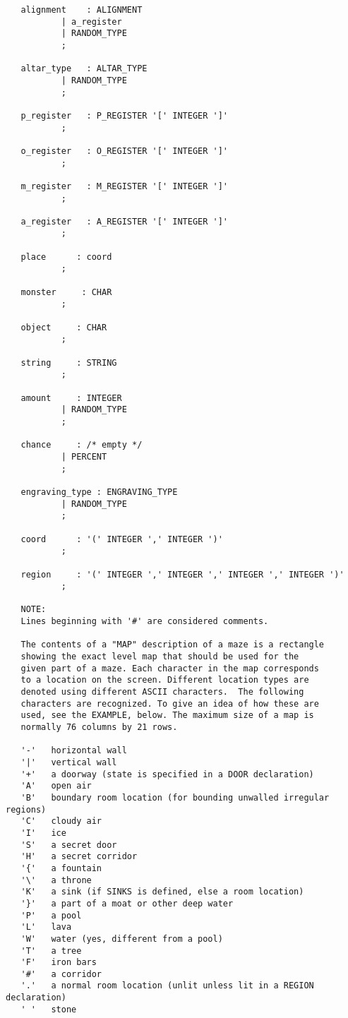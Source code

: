 \documentclass[11pt]{article}
\begin{document}
\begin{verbatim}
   alignment    : ALIGNMENT
           | a_register
           | RANDOM_TYPE
           ;

   altar_type   : ALTAR_TYPE
           | RANDOM_TYPE
           ;

   p_register   : P_REGISTER '[' INTEGER ']'
           ;

   o_register   : O_REGISTER '[' INTEGER ']'
           ;

   m_register   : M_REGISTER '[' INTEGER ']'
           ;

   a_register   : A_REGISTER '[' INTEGER ']'
           ;

   place      : coord
           ;

   monster     : CHAR
           ;

   object     : CHAR
           ;

   string     : STRING
           ;

   amount     : INTEGER
           | RANDOM_TYPE
           ;

   chance     : /* empty */
           | PERCENT
           ;

   engraving_type : ENGRAVING_TYPE
           | RANDOM_TYPE
           ;

   coord      : '(' INTEGER ',' INTEGER ')'
           ;

   region     : '(' INTEGER ',' INTEGER ',' INTEGER ',' INTEGER ')'
           ;

   NOTE:
   Lines beginning with '#' are considered comments.

   The contents of a "MAP" description of a maze is a rectangle
   showing the exact level map that should be used for the
   given part of a maze. Each character in the map corresponds
   to a location on the screen. Different location types are
   denoted using different ASCII characters.  The following
   characters are recognized. To give an idea of how these are
   used, see the EXAMPLE, below. The maximum size of a map is
   normally 76 columns by 21 rows.

   '-'   horizontal wall
   '|'   vertical wall
   '+'   a doorway (state is specified in a DOOR declaration)
   'A'   open air
   'B'   boundary room location (for bounding unwalled irregular regions)
   'C'   cloudy air
   'I'   ice
   'S'   a secret door
   'H'   a secret corridor
   '{'   a fountain
   '\'   a throne
   'K'   a sink (if SINKS is defined, else a room location)
   '}'   a part of a moat or other deep water
   'P'   a pool
   'L'   lava
   'W'   water (yes, different from a pool)
   'T'   a tree
   'F'   iron bars
   '#'   a corridor
   '.'   a normal room location (unlit unless lit in a REGION declaration)
   ' '   stone


\end{verbatim}
\end{document}
